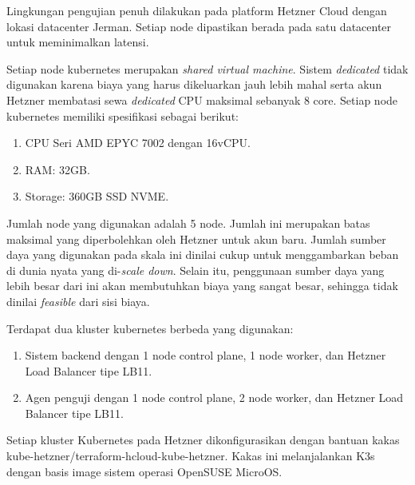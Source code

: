 Lingkungan pengujian penuh dilakukan pada platform Hetzner Cloud dengan lokasi datacenter Jerman. Setiap node dipastikan berada pada satu datacenter untuk meminimalkan latensi.

Setiap node kubernetes merupakan \textit{shared virtual machine}. Sistem \textit{dedicated} tidak digunakan karena biaya yang harus dikeluarkan jauh lebih mahal serta akun Hetzner membatasi sewa \textit{dedicated} CPU maksimal sebanyak 8 core. Setiap node kubernetes memiliki spesifikasi sebagai berikut:

\begin{enumerate}
    \item CPU Seri AMD EPYC 7002 dengan 16vCPU.
    \item RAM: 32GB.
    \item Storage: 360GB SSD NVME.
\end{enumerate}

Jumlah node yang digunakan adalah 5 node. Jumlah ini merupakan batas maksimal yang diperbolehkan oleh Hetzner untuk akun baru. Jumlah sumber daya yang digunakan pada skala ini dinilai cukup untuk menggambarkan beban di dunia nyata yang di-\textit{scale down}. Selain itu, penggunaan sumber daya yang lebih besar dari ini akan membutuhkan biaya yang sangat besar, sehingga tidak dinilai \textit{feasible} dari sisi biaya.

Terdapat dua kluster kubernetes berbeda yang digunakan:

\begin{enumerate}
    \item Sistem backend dengan 1 node control plane, 1 node worker, dan Hetzner Load Balancer tipe LB11.
    \item Agen penguji dengan 1 node control plane, 2 node worker, dan Hetzner Load Balancer tipe LB11.
\end{enumerate}

Setiap kluster Kubernetes pada Hetzner dikonfigurasikan dengan bantuan kakas kube-hetzner/terraform-hcloud-kube-hetzner. Kakas ini melanjalankan K3s dengan basis image sistem operasi OpenSUSE MicroOS.
